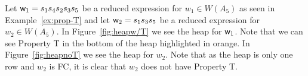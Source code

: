 
\begin{example}
Let $\mathsf{w}_1=s_1s_4s_2s_3s_5$ be a reduced expression for $w_1 \in W(A_5)$ as seen in Example~\ref{ex:prop-T}	and let $\mathsf{w}_2=s_1s_3s_5$ be a reduced expression for $w_2 \in W(A_5)$. In Figure~\ref{fig:heapw/T} we see the heap for $\mathsf{w}_1$. Note that we can see Property T in the bottom of the heap highlighted in orange. In Figure~\ref{fig:heapnoT} we see the heap for $w_2$. Note that as the heap is only one row and $w_2$ is FC, it is clear that $w_2$ does not have Property T.
\end{example}


